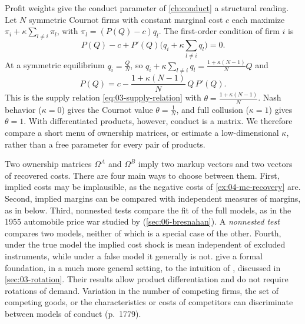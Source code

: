 \begin{remark}\label{rem:04-kappa-theta}
Profit weights give the conduct parameter of \cref{ch:conduct} a structural reading. Let $N$ symmetric Cournot
firms with constant marginal cost $c$ each maximize $\pi_i + \kappa\sum_{l \neq i}\pi_l$, with $\pi_l = (P(Q) -
c)q_l$. The first-order condition of firm $i$ is
\begin{equation*}
P(Q) - c + P'(Q)\Big(q_i + \kappa\sum_{l \neq i}q_l\Big) = 0 .
\end{equation*}
At a symmetric equilibrium $q_i = \frac{Q}{N}$, so $q_i + \kappa\sum_{l \neq i}q_l = \frac{1 + \kappa(N - 1)}{N}Q$
and
\begin{equation*}
P(Q) = c - \frac{1 + \kappa(N - 1)}{N}\,Q\,P'(Q) .
\end{equation*}
This is the supply relation \eqref{eq:03-supply-relation} with $\theta = \frac{1 + \kappa(N - 1)}{N}$. Nash
behavior ($\kappa = 0$) gives the Cournot value $\theta = \frac{1}{N}$, and full collusion ($\kappa = 1$) gives
$\theta = 1$. With differentiated products, however, conduct is a matrix. We therefore compare a short menu of
ownership matrices, or estimate a low-dimensional $\kappa$, rather than a free parameter for every pair of
products.
\end{remark}

Two ownership matrices $\Omega^A$ and $\Omega^B$ imply two markup vectors and two vectors of recovered costs. There
are four main ways to choose between them. First, implied costs may be implausible, as the negative costs of
\cref{ex:04-mc-recovery} are. Second, implied margins can be compared with independent measures of margins, as in
\citet{Nevo2001} below. Third, nonnested tests compare the fit of the full models, as in the 1955 automobile
price war studied by \citet{Bresnahan1987} (\cref{sec:06-bresnahan}). A \emph{nonnested test} compares two models,
neither of which is a special case of the other. Fourth, under the true model the implied
cost shock is mean independent of excluded instruments, while under a false model it generally is not.
\citet[Section~6, p.~1776]{BerryHaile2014} give a formal foundation, in a much more general setting, to the
intuition of \citet{Bresnahan1982}, discussed in \cref{sec:03-rotation}. Their results allow product differentiation and do not require rotations of
demand. Variation in the number of competing firms, the set of competing goods, or the characteristics or costs of
competitors can discriminate between models of conduct (p.~1779).

